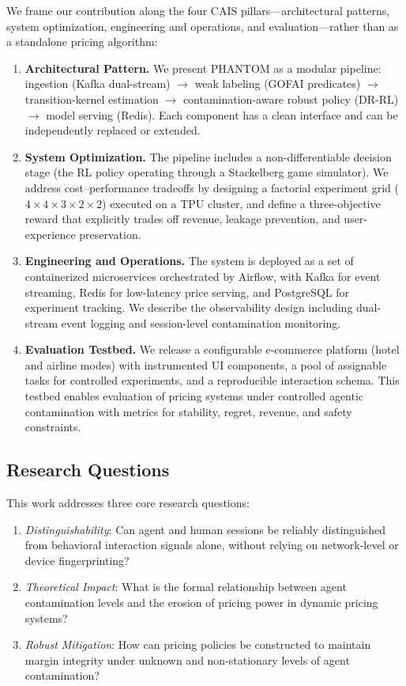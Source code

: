 \documentclass[sigconf]{acmart}
\begin{document}
We frame our contribution along the four CAIS pillars---architectural patterns, system optimization, engineering and operations, and evaluation---rather than as a standalone pricing algorithm:

\begin{enumerate}
    \item \textbf{Architectural Pattern.} We present PHANTOM as a modular pipeline: ingestion (Kafka dual-stream) $\to$ weak labeling (GOFAI predicates) $\to$ transition-kernel estimation $\to$ contamination-aware robust policy (DR-RL) $\to$ model serving (Redis). Each component has a clean interface and can be independently replaced or extended.

    \item \textbf{System Optimization.} The pipeline includes a non-differentiable decision stage (the RL policy operating through a Stackelberg game simulator). We address cost--performance tradeoffs by designing a factorial experiment grid ($4\times4\times3\times2\times2$) executed on a TPU cluster, and define a three-objective reward that explicitly trades off revenue, leakage prevention, and user-experience preservation.

    \item \textbf{Engineering and Operations.} The system is deployed as a set of containerized microservices orchestrated by Airflow, with Kafka for event streaming, Redis for low-latency price serving, and PostgreSQL for experiment tracking. We describe the observability design including dual-stream event logging and session-level contamination monitoring.

    \item \textbf{Evaluation Testbed.} We release a configurable e-commerce platform (hotel and airline modes) with instrumented UI components, a pool of assignable tasks for controlled experiments, and a reproducible interaction schema. This testbed enables evaluation of pricing systems under controlled agentic contamination with metrics for stability, regret, revenue, and safety constraints.
\end{enumerate}

\subsection{Research Questions}

This work addresses three core research questions:
\begin{enumerate}
    \item[\textbf{RQ1}] \textit{Distinguishability}: Can agent and human sessions be reliably distinguished from behavioral interaction signals alone, without relying on network-level or device fingerprinting?
    \item[\textbf{RQ2}] \textit{Theoretical Impact}: What is the formal relationship between agent contamination levels and the erosion of pricing power in dynamic pricing systems?
    \item[\textbf{RQ3}] \textit{Robust Mitigation}: How can pricing policies be constructed to maintain margin integrity under unknown and non-stationary levels of agent contamination?
\end{enumerate}
\end{document}
